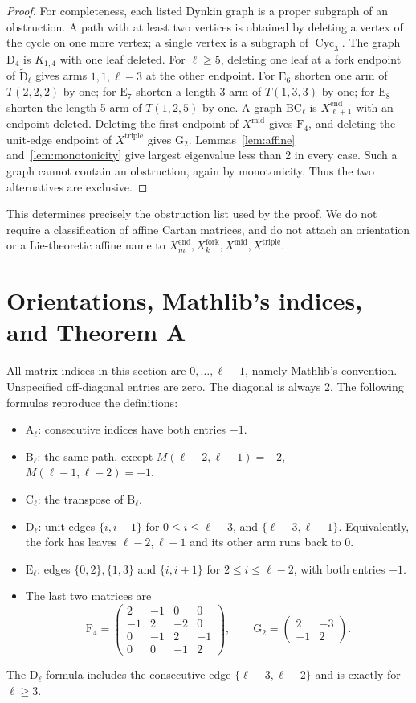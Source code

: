 \documentclass[11pt]{amsart}
\newcommand\opk[1]{\mathop{\mathrm{#1}}\nolimits}
\newcommand\pmat[1]{\begin{pmatrix} #1 \end{pmatrix}}
\theoremstyle{definition}
\newcommand{\typ}[1]{\mathrm{#1}}
\DeclareRobustCommand{\ml}[1]{\ifmmode\text{\normalfont\small\ttfamily\detokenize{#1}}\else{\normalfont\small\nolinkurl{#1}}\fi}
\newcommand{\Cyc}{\opk{Cyc}}
\begin{document}
\begin{proof}
For completeness, each listed Dynkin graph is a proper subgraph of an
obstruction. A path with at least two vertices is obtained by deleting a
vertex of the cycle on one more vertex; a single vertex is a subgraph of
$\Cyc_3$. The graph $\typ D_4$ is $K_{1,4}$ with one leaf deleted.
For $\ell\geq5$, deleting one leaf at a fork endpoint of
$\widetilde{\typ D}_\ell$ gives arms $1,1,\ell-3$ at the other endpoint.
For $\typ E_6$ shorten one arm of $T(2,2,2)$ by one; for $\typ E_7$
shorten a length-3 arm of $T(1,3,3)$ by one; for $\typ E_8$ shorten
the length-5 arm of $T(1,2,5)$ by one. A graph $\typ{BC}_\ell$ is
$X^{\mathrm{end}}_{\ell+1}$ with an endpoint deleted. Deleting the first endpoint of
$X^{\mathrm{mid}}$ gives $\typ F_4$, and deleting the unit-edge endpoint of $X^{\mathrm{triple}}$ gives
$\typ G_2$. Lemmas~\ref{lem:affine} and~\ref{lem:monotonicity} give
largest eigenvalue less than 2 in every case. Such a graph cannot contain
an obstruction, again by monotonicity. Thus the two alternatives are
exclusive.
\end{proof}

This determines precisely the obstruction list used by the proof. We do not
require a classification of affine Cartan matrices, and do not attach an
orientation or a Lie-theoretic affine name to $X^{\mathrm{end}}_m,X^{\mathrm{fork}}_k,X^{\mathrm{mid}},X^{\mathrm{triple}}$.

\section{Orientations, Mathlib's indices, and Theorem A}\label{sec:cartan}

All matrix indices in this section are $0,\ldots,\ell-1$, namely
Mathlib's \ml{Fin} convention. Unspecified off-diagonal entries are zero.
The diagonal is always 2. The following formulas reproduce the definitions:
\begin{itemize}
\item $\typ A_\ell$: consecutive indices have both entries $-1$.
\item $\typ B_\ell$: the same path, except
 $M(\ell-2,\ell-1)=-2$, $M(\ell-1,\ell-2)=-1$.
\item $\typ C_\ell$: the transpose of $\typ B_\ell$.
\item $\typ D_\ell$: unit edges $\{i,i+1\}$ for $0\leq i\leq\ell-3$,
 and $\{\ell-3,\ell-1\}$. Equivalently, the fork has leaves
 $\ell-2,\ell-1$ and its other arm runs back to 0.
\item $\typ E_\ell$: edges $\{0,2\},\{1,3\}$ and $\{i,i+1\}$
 for $2\leq i\leq\ell-2$, with both entries $-1$.
\item The last two matrices are
\[
 \typ F_4=\pmat{2&-1&0&0\\-1&2&-2&0\\0&-1&2&-1\\0&0&-1&2},
 \qquad \typ G_2=\pmat{2&-3\\-1&2}.
\]
\end{itemize}
The $\typ D_\ell$ formula includes the consecutive edge
$\{\ell-3,\ell-2\}$ and is exactly \ml{CartanMatrix.D} for $\ell\geq3$.
\end{document}
